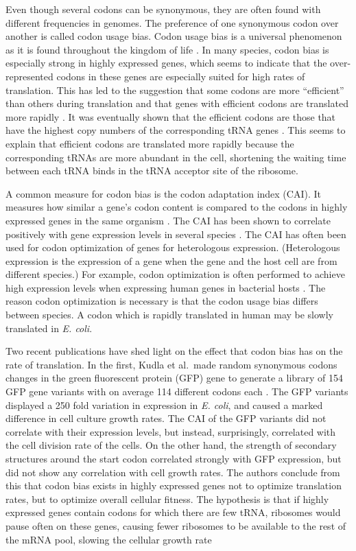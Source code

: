 Even though several codons can be synonymous, they are often found with
different frequencies in genomes. The preference of one synonymous codon over
another is called codon usage bias. Codon usage bias is a universal phenomenon
as it is found throughout the kingdom of life \cite{sharp_codon_1988}. In many
species, codon bias is especially strong in highly expressed genes, which seems
to indicate that the over-represented codons in these genes are especially
suited for high rates of translation.  This has led to the suggestion that some
codons are more ``efficient'' than others during translation and that genes
with efficient codons are translated more rapidly \cite{moriyama_gene_1998}. It
was eventually shown that the efficient codons are those that have the highest
copy numbers of the corresponding tRNA genes \cite{reis_solving_2004,
elf_selective_2003}. This seems to explain that efficient codons are translated
more rapidly because the corresponding tRNAs are more abundant in the cell,
shortening the waiting time between each tRNA binds in the tRNA acceptor site
of the ribosome.

A common measure for codon bias is the codon adaptation index (CAI). It
measures how similar a gene's codon content is compared to the codons in highly
expressed genes in the same organism \cite{sharp_codon_1987}. The CAI has been
shown to correlate positively with gene expression levels in several species
\cite{duret_expression_1999, jansen_revisiting_2003}. The CAI has often been
used for codon optimization of genes for heterologous expression. (Heterologous
expression is the expression of a gene when the gene and the host cell are from
different species.) For example, codon optimization is often performed to
achieve high expression levels when expressing human genes in bacterial hosts
\cite{gustafsson_codon_2004}. The reason codon optimization is necessary is
that the codon usage bias differs between species. A codon which is rapidly
translated in human may be slowly translated in \textit{E. coli}.

Two recent publications have shed light on the effect that codon bias has on
the rate of translation. In the first, Kudla et al.\ made random synonymous
codons changes in the green fluorescent protein (GFP) gene to generate a
library of 154 GFP gene variants with on average 114 different codons each
\cite{kudla_coding-sequence_2009}. The GFP variants displayed a 250 fold
variation in expression in \textit{E. coli}, and caused a marked difference in
cell culture growth rates. The CAI of the GFP variants did not correlate with
their expression levels, but instead, surprisingly, correlated with the cell
division rate of the cells. On the other hand, the strength of secondary
structures around the start codon correlated strongly with GFP expression, but
did not show any correlation with cell growth rates. The authors conclude from
this that codon bias exists in highly expressed genes not to optimize
translation rates, but to optimize overall cellular fitness. The hypothesis is
that if highly expressed genes contain codons for which there are few tRNA,
ribosomes would pause often on these genes, causing fewer ribosomes to be
available to the rest of the mRNA pool, slowing the cellular growth rate
\cite{kudla_coding-sequence_2009}

